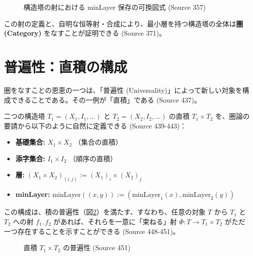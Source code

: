 \documentclass[11pt]{ltjsarticle}
\theoremstyle{definition}
\theoremstyle{plain}
\theoremstyle{remark}
\begin{document}
\begin{figure}[hbt]
    \centering
    \caption{構造塔の射における minLayer 保存の可換図式 (Source 357)}
    \label{fig:morphism_commute}
\end{figure}

この射の定義と、自明な恒等射・合成により、最小層を持つ構造塔の全体は\textbf{圏 (Category)} をなすことが証明できる (Source 371)。

\section{普遍性：直積の構成}

圏をなすことの恩恵の一つは、「普遍性 (Universality)」によって新しい対象を構成できることである。その一例が「直積」である (Source 437)。

二つの構造塔 $T_1 = (X_1, I_1, \dots)$ と $T_2 = (X_2, I_2, \dots)$ の直積 $T_1 \times T_2$ を、圏論の要請から以下のように自然に定義できる (Source 439-443)：
\begin{itemize}
    \item \textbf{基礎集合:} $X_1 \times X_2$ （集合の直積）
    \item \textbf{添字集合:} $I_1 \times I_2$ （順序の直積）
    \item \textbf{層:} $(X_1 \times X_2)_{(i, j)} := (X_1)_i \times (X_2)_j$
    \item \textbf{minLayer:} $\text{minLayer}((x, y)) := (\text{minLayer}_1(x), \text{minLayer}_2(y))$
\end{itemize}

この構成は、積の普遍性（図\ref{fig:product_up}）を満たす、すなわち、任意の対象 $T$ から $T_1$ と $T_2$ への射 $f_1, f_2$ があれば、それらを一意に「束ねる」射 $\Phi: T \to T_1 \times T_2$ がただ一つ存在することを示すことができる (Source 448-451)。

\begin{figure}[hbt]
    \centering
    \caption{直積 $T_1 \times T_2$ の普遍性 (Source 451)}
    \label{fig:product_up}
\end{figure}
\end{document}
